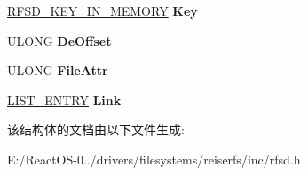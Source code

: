\begin{DoxyCompactItemize}
\mbox{\label{struct___r_f_s_d___m_c_b_af0247f62654485f48dc7497084ce30c7}} 
\hyperlink{structreiserfs__cpu__key}{R\+F\+S\+D\+\_\+\+K\+E\+Y\+\_\+\+I\+N\+\_\+\+M\+E\+M\+O\+RY} {\bfseries Key}
\item 
\mbox{\label{struct___r_f_s_d___m_c_b_af5ade061c9acdb9e7b7ff5923c11991b}} 
U\+L\+O\+NG {\bfseries De\+Offset}
\item 
\mbox{\label{struct___r_f_s_d___m_c_b_ae4b01b19b5ece8e646e0c40edad0d5cf}} 
U\+L\+O\+NG {\bfseries File\+Attr}
\item 
\mbox{\label{struct___r_f_s_d___m_c_b_ab4b637bafb2186cf14b71194af581104}} 
\hyperlink{struct___l_i_s_t___e_n_t_r_y}{L\+I\+S\+T\+\_\+\+E\+N\+T\+RY} {\bfseries Link}
\end{DoxyCompactItemize}


该结构体的文档由以下文件生成\+:\begin{DoxyCompactItemize}
\item 
E\+:/\+React\+O\+S-\/0../drivers/filesystems/reiserfs/inc/rfsd.\+h\end{DoxyCompactItemize}

